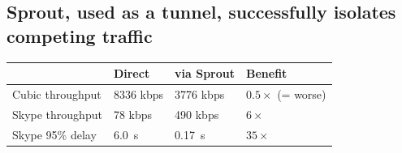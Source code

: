 \begin{multicols}{2}
\subsection*{Sprout, used as a tunnel, successfully isolates competing traffic}
\begin{center}
{\large \bf
\noindent \begin{tabular}{|l|l|l|l|}
\hline
& Direct & via Sprout & Benefit \\
\hline
\hline
Cubic throughput & 8336 kbps & 3776 kbps & \cellcolor{red!20}$0.5 \times$ (= worse) \\
Skype throughput & 78 kbps & 490 kbps & \cellcolor{blue!20}$6 \times$ \\
Skype 95\% delay & 6.0~s & 0.17~s & \cellcolor{blue!20}$35 \times$ \\
\hline
\end{tabular}
}
\end{center}

\end{multicols}
